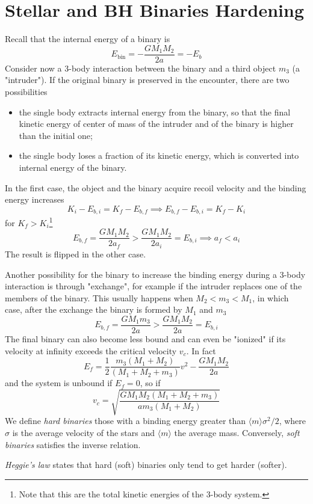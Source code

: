 \section{Stellar and BH Binaries Hardening}
Recall that the internal energy of a binary is 
\begin{equation*}
    E_{\text{bin}} = -\frac{GM_{1}M_{2}}{2a} = -E_{b}
\end{equation*}
Consider now a 3-body interaction between the binary and a third object $m_{3}$ (a "intruder"). If the original binary is preserved in the encounter, there are two possibilities
\begin{itemize}
    \item the single body extracts internal energy from the binary, so that the final kinetic energy of center of mass of the intruder and of the binary is higher than the initial one;
    \item the single body loses a fraction of its kinetic energy, which is converted into internal energy of the binary.
\end{itemize}
In the first case, the object and the binary acquire recoil velocity and the binding energy increases
\begin{equation*}
    K_{i}-E_{b,i} = K_{f}-E_{b,f} \implies E_{b,f}-E_{b,i} = K_{f}-K_{i}
\end{equation*}
for $K_{f}>K_{i}$\footnote{Note that this are the total kinetic energies of the 3-body system.}
\begin{equation*}
    E_{b,f} = \frac{GM_{1}M_{2}}{2a_{f}} > \frac{GM_{1}M_{2}}{2a_{i}} = E_{b,i} \implies a_{f}<a_{i}
\end{equation*}
The result is flipped in the other case.
\par Another possibility for the binary to increase the binding energy during a 3-body interaction is through "exchange", for example if the intruder replaces one of the members of the binary. This usually happens when $M_{2}<m_{3}<M_{1}$, in which case, after the exchange the binary is formed by $M_{1}$ and $m_{3}$
\begin{equation*}
    E_{b,f} = \frac{GM_{1}m_{3}}{2a} > \frac{GM_{1}M_{2}}{2a} = E_{b,i}
\end{equation*}
The ﬁnal binary can also become less bound and can even be "ionized" if its velocity at inﬁnity exceeds the critical velocity $v_{c}$. In fact
\begin{equation*}
    E_{f} = \frac{1}{2}\frac{m_{3}(M_{1}+ M_{2})}{(M_{1}+M_{2}+m_{3})}v^{2}-\frac{GM_{1}M_{2}}{2a}
\end{equation*}
and the system is unbound if $E_{f}=0$, so if
\begin{equation}
    v_{c} = \sqrt{\frac{GM_{1}M_{2}(M_{1}+M_{2}+m_{3})}{am_{3}(M_{1}+M_{2})}}
    \label{eq:critical_velocity}
\end{equation}
We define \emph{hard binaries} those with a binding energy greater than $\langle m \rangle \sigma^{2}/2$, where $\sigma$ is the average velocity of the stars and $\langle m \rangle$ the average mass. Conversely, \emph{soft binaries} satisfies the inverse relation.
\par \emph{Heggie's law} states that hard (soft) binaries only tend to get harder (softer).
